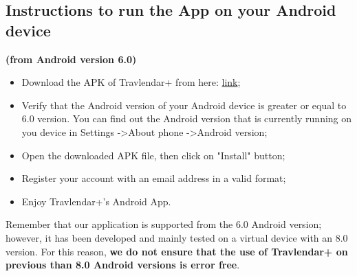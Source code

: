 \subsection{Instructions to run the App on your Android device}
\label{subsect:Android device Instructions}
\textbf{(from Android version 6.0)}
\begin{itemize}
	\item Download the APK of Travlendar+ from here: \href{https://github.com/JustSalva/MelziPinaSalvadore/tree/master/DeliveryFolder/InstallationFolder/travlendarPlus.apk}{\color{blue}link};
	\item Verify that the Android version of your Android device is greater or equal to 6.0 version. You can find out the Android version that is currently running on you device in Settings -\textgreater  About phone -\textgreater  Android version;
	\item Open the downloaded APK file, then click on "Install" button;
	\item Register your account with an email address in a valid format;
	\item Enjoy Travlendar+'s Android App.	\\
\end{itemize}
Remember that our application is supported from the 6.0 Android version; however, it has been developed and mainly tested on a virtual device with an 8.0 version. For this reason, \textbf{we do not ensure that the use of Travlendar+ on previous than 8.0 Android versions is error free}.